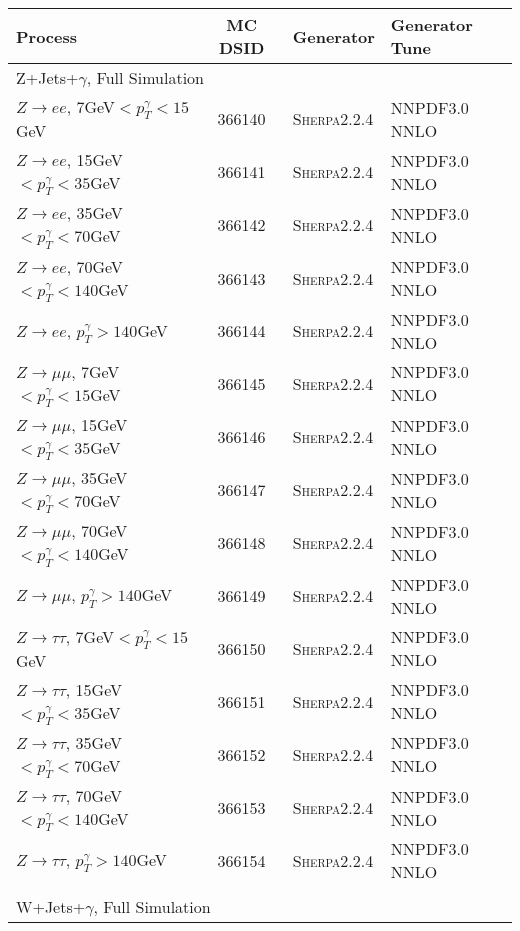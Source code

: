 \begin{table}[h!]
\scriptsize
\begin{center}
{\renewcommand{\arraystretch}{1.2}
\begin{tabular}{@{} lcll @{}}
\hhline{====}
Process	&	 MC DSID		&	Generator	& Generator Tune  \\ \hline
\multicolumn{4}{l}{Z+Jets+$\gamma$, Full Simulation} \\ \hline
$Z\rightarrow ee$, 7GeV$<p_T^\gamma<15$GeV & 366140& \textsc{Sherpa2.2.4} &NNPDF3.0 NNLO \\
$Z\rightarrow ee$, 15GeV$<p_T^\gamma<35$GeV & 366141& \textsc{Sherpa2.2.4} &NNPDF3.0 NNLO \\
$Z\rightarrow ee$, 35GeV$<p_T^\gamma<70$GeV & 366142& \textsc{Sherpa2.2.4} &NNPDF3.0 NNLO \\
$Z\rightarrow ee$, 70GeV$<p_T^\gamma<140$GeV & 366143& \textsc{Sherpa2.2.4} &NNPDF3.0 NNLO \\
$Z\rightarrow ee$, $p_T^\gamma>140$GeV & 366144& \textsc{Sherpa2.2.4} &NNPDF3.0 NNLO \\
$Z\rightarrow \mu\mu$, 7GeV$<p_T^\gamma<15$GeV & 366145& \textsc{Sherpa2.2.4} &NNPDF3.0 NNLO \\
$Z\rightarrow \mu\mu$, 15GeV$<p_T^\gamma<35$GeV & 366146& \textsc{Sherpa2.2.4} &NNPDF3.0 NNLO \\
$Z\rightarrow \mu\mu$, 35GeV$<p_T^\gamma<70$GeV & 366147& \textsc{Sherpa2.2.4} &NNPDF3.0 NNLO \\
$Z\rightarrow \mu\mu$, 70GeV$<p_T^\gamma<140$GeV & 366148& \textsc{Sherpa2.2.4} &NNPDF3.0 NNLO \\
$Z\rightarrow \mu\mu$, $p_T^\gamma>140$GeV & 366149& \textsc{Sherpa2.2.4} &NNPDF3.0 NNLO \\
$Z\rightarrow \tau\tau$, 7GeV$<p_T^\gamma<15$GeV & 366150& \textsc{Sherpa2.2.4} &NNPDF3.0 NNLO \\
$Z\rightarrow \tau\tau$, 15GeV$<p_T^\gamma<35$GeV & 366151& \textsc{Sherpa2.2.4} &NNPDF3.0 NNLO \\
$Z\rightarrow \tau\tau$, 35GeV$<p_T^\gamma<70$GeV & 366152& \textsc{Sherpa2.2.4} &NNPDF3.0 NNLO \\
$Z\rightarrow \tau\tau$, 70GeV$<p_T^\gamma<140$GeV & 366153& \textsc{Sherpa2.2.4} &NNPDF3.0 NNLO \\
$Z\rightarrow \tau\tau$, $p_T^\gamma>140$GeV & 366154& \textsc{Sherpa2.2.4} &NNPDF3.0 NNLO \\ \hline \\
\multicolumn{4}{l}{W+Jets+$\gamma$, Full Simulation} \\ \hline

\end{tabular}}
\end{center}
\end{table}
